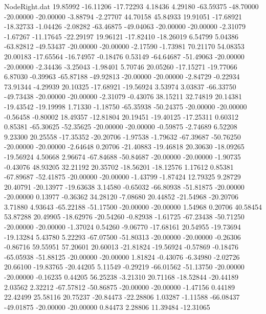 \begin{filecontents}{NodeRight.dat}
  19.85992  -16.11206  -17.72293     4.18436    4.29180  -63.59375  -48.70000  -20.00000  -20.00000   -3.88794   -2.27707   44.70158   45.84933
  19.91051  -17.68921  -18.32733    -1.04426   -2.08282  -63.46875  -49.04063  -20.00000  -20.00000   -2.31079   -1.67267  -11.17645  -22.29197
  19.96121  -17.82410  -18.26019     6.54799    5.04386  -63.82812  -49.53437  -20.00000  -20.00000   -2.17590   -1.73981   70.21170   54.08353
  20.00183  -17.65564  -16.74957    -0.18476    0.53149  -64.64687  -51.49063  -20.00000  -20.00000   -2.34436   -3.25043   -1.98401    5.70746
  20.05260  -17.15271  -19.77066     6.87030   -0.39963  -65.87188  -49.92813  -20.00000  -20.00000   -2.84729   -0.22934   73.91344   -4.29939
  20.10325  -17.68921  -19.56924     3.53974    3.03837  -66.33750  -49.73438  -20.00000  -20.00000   -2.31079   -0.43076   38.15211   32.74819
  20.14381  -19.43542  -19.19998     1.71330   -1.18750  -65.35938  -50.24375  -20.00000  -20.00000   -0.56458   -0.80002   18.49357  -12.81804
  20.19451  -19.40125  -17.25311     0.60312    0.85381  -65.30625  -52.35625  -20.00000  -20.00000   -0.59875   -2.74689    6.52208    9.23300
  20.25558  -17.35352  -20.20706    -1.97538   -1.79632  -67.39687  -50.76250  -20.00000  -20.00000   -2.64648    0.20706  -21.40883  -19.46818
  20.30630  -18.09265  -19.56924     4.50668    2.96674  -67.84688  -50.84687  -20.00000  -20.00000   -1.90735   -0.43076   48.93205   32.21192
  20.35702  -18.56201  -18.12576     1.17612    0.85381  -67.89687  -52.41875  -20.00000  -20.00000   -1.43799   -1.87424   12.79325    9.28729
  20.40791  -20.13977  -19.63638     3.14580   -0.65032  -66.80938  -51.81875  -20.00000  -20.00000    0.13977   -0.36362   34.28120   -7.08680
  20.44852  -21.54968  -20.20706     3.71880    4.93643  -65.22188  -51.17500  -20.00000  -20.00000    1.54968    0.20706   40.58454   53.87288
  20.49905  -18.62976  -20.54260    -0.82938   -1.61725  -67.23438  -50.71250  -20.00000  -20.00000   -1.37024    0.54260   -9.06770  -17.68161
  20.54955  -19.73694  -19.13284     5.43780    5.22293  -67.07500  -51.80313  -20.00000  -20.00000   -0.26306   -0.86716   59.55951   57.20601
  20.60013  -21.81824  -19.56924    -0.57869   -0.18476  -65.05938  -51.88125  -20.00000  -20.00000    1.81824   -0.43076   -6.34980   -2.02726
  20.66100  -19.83765  -20.44205     5.11549   -0.29219  -66.01562  -51.13750  -20.00000  -20.00000   -0.16235    0.44205   56.25238   -3.21310
  20.71168  -18.52844  -20.44189     2.03562    2.32212  -67.57812  -50.86875  -20.00000  -20.00000   -1.47156    0.44189   22.42499   25.58116
  20.75237  -20.84473  -22.28806     1.03287   -1.11588  -66.08437  -49.01875  -20.00000  -20.00000    0.84473    2.28806   11.39484  -12.31065

\end{filecontents}
